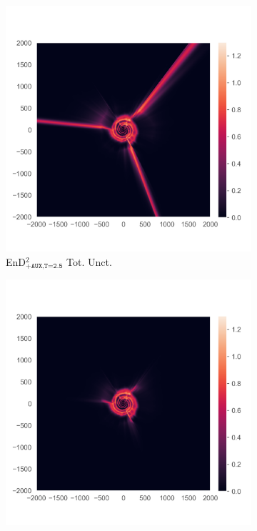 \begin{figure}
\begin{subfigure}{0.22\textwidth}
  \centering
  \includegraphics[trim=42 45 15 55, clip, width=\linewidth]{plots/3m.png}
  \caption{EnD$^2_{\texttt{+AUX,T=2.5}}$ Tot. Unct.}
  \label{fig:3m}
\end{subfigure}%
\begin{subfigure}{0.22\textwidth}
  \centering
  \includegraphics[trim=42 45 15 55, clip, width=\linewidth]{plots/3n.png}

\end{subfigure}
\end{figure}
